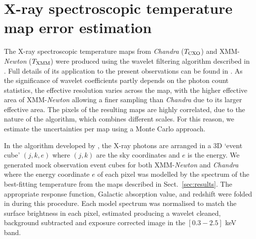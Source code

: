 \documentclass[twocolumn,traditabstract]{aa}
\newcommand{\ccor}[1]{\textcolor{Mypink}{#1}}
\def \TXC {T_{\rm CXO}}
\def \TXX {T_{\rm XMM}}
\begin{document}
\section{X-ray spectroscopic temperature map error estimation}\label{append:Txerror}
\ccor{The X-ray spectroscopic temperature maps from \textit{Chandra} ($\TXC$) and XMM-\textit{Newton} ($\TXX$) were produced using the wavelet filtering algorithm described in \cite{Bourdin2008}. Full details of its application to the present observations can be found in \cite{Adam2016b}. As the significance of wavelet coefficients partly depends on the photon count statistics, the effective resolution varies across the map, with the higher effective area of XMM-\textit{Newton} allowing a finer sampling than \textit{Chandra} due to its larger effective area. The pixels of the resulting maps are highly correlated, due to the nature of the algorithm, which combines different scales. For this reason, we estimate the uncertainties per map using a Monte Carlo approach.}

\ccor{In the algorithm developed by \citet{Bourdin2008}, the X-ray photons are arranged in a 3D `event cube' $(j,k,e)$ where $(j,k)$ are the sky coordinates and $e$ is the energy. We generated mock observation event cubes for both XMM-{\it Newton} and {\it Chandra} where the energy coordinate $e$ of each pixel was modelled by the spectrum of the best-fitting temperature from the maps described in Sect.~\ref{sec:results}. The appropriate response function, Galactic absorption value, and redshift were folded in during this procedure. Each model spectrum was normalised to match the surface brightness in each pixel, estimated producing a wavelet cleaned, background subtracted and exposure corrected image in the $[0.3-2.5]$ keV band. }
\end{document}
